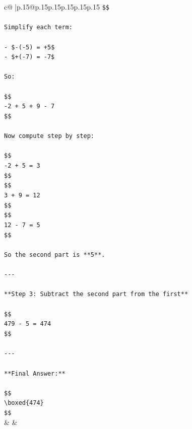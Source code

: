 \documentclass{article}
\begin{document}
{\begin{supertabular}{c@{$\;$}|p{.15\linewidth}@{}p{.15\linewidth}p{.15\linewidth}p{.15\linewidth}p{.15\linewidth}p{.15\linewidth}}
{{{\texttt{\$\$} \\
\\ 
\texttt{Simplify each term:} \\
\\ 
\texttt{{-} \${-}({-}5) = +5\$} \\
\texttt{{-} \$+({-}7) = {-}7\$} \\
\\ 
\texttt{So:} \\
\\ 
\texttt{\$\$} \\
\texttt{{-}2 + 5 + 9 {-} 7} \\
\texttt{\$\$} \\
\\ 
\texttt{Now compute step by step:} \\
\\ 
\texttt{\$\$} \\
\texttt{{-}2 + 5 = 3} \\
\texttt{\$\$} \\
\texttt{\$\$} \\
\texttt{3 + 9 = 12} \\
\texttt{\$\$} \\
\texttt{\$\$} \\
\texttt{12 {-} 7 = 5} \\
\texttt{\$\$} \\
\\ 
\texttt{So the second part is **5**.} \\
\\ 
\texttt{{-}{-}{-}} \\
\\ 
\texttt{**Step 3: Subtract the second part from the first**} \\
\\ 
\texttt{\$\$} \\
\texttt{479 {-} 5 = 474} \\
\texttt{\$\$} \\
\\ 
\texttt{{-}{-}{-}} \\
\\ 
\texttt{**Final Answer:**} \\
\\ 
\texttt{\$\$} \\
\texttt{\textbackslash{}boxed\{474\}} \\
\texttt{\$\$} \\
            }
        }
    }
    & & \\ \\


\end{supertabular}}
\end{document}
